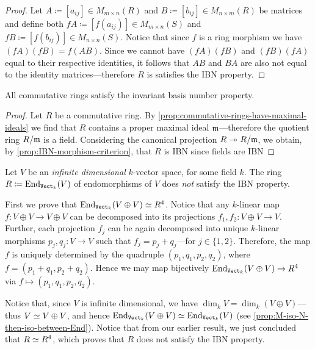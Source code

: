 \begin{proof}
    Let \(A \coloneq [a_{ij}] \in M_{m \times n}(R)\) and
    \(B \coloneq [b_{ij}] \in M_{n \times m}(R)\) be matrices and define both
    \(fA \coloneq [f(a_{ij})] \in M_{m \times n}(S)\) and
    \(fB \coloneq [f(b_{ij})] \in M_{n \times n}(S)\). Notice that since \(f\) is a
    ring morphism we have \((f A)(f B) = f(A B)\). Since we cannot have \((f A) (f
    B)\) and \((f B) (f A)\) equal to their respective identities, it follows that
    \(A B\) and \(B A\) are also not equal to the identity matrices---therefore
    \(R\) is satisfies the IBN property.
\end{proof}

\begin{theorem}
    \label{thm:commutative-rings-satisfy-IBN}
    All commutative rings satisfy the invariant basis number property.
\end{theorem}

\begin{proof}
    Let \(R\) be a commutative ring. By
    \cref{prop:commutative-rings-have-maximal-ideals} we find that \(R\) contains a
    proper maximal ideal \(\mathfrak{m}\)---therefore the quotient ring \(R/\mathfrak{m}\)
    is a field. Considering the canonical projection \(R \twoheadrightarrow R/\mathfrak{m}\), we
    obtain, by \cref{prop:IBN-morphism-criterion}, that \(R\) is IBN since fields
    are IBN
\end{proof}

\begin{example}
    \label{exp:End(V)-isnt-IBN}
    Let \(V\) be an \emph{infinite dimensional} \(k\)-vector space, for some field
    \(k\). The ring \(R \coloneq \operatorname{End}_{{\texttt{Vect}}_k}(V)\) of endomorphisms of \(V\) does
    \emph{not} satisfy the IBN property.

    First we prove that \(\operatorname{End}_{{\texttt{Vect}}_k}(V \oplus V) \simeq R^4\). Notice that any
    \(k\)-linear map \(f: V \oplus V \to V \oplus V\) can be decomposed into its
    projections \(f_1, f_2: V \oplus V \to V\). Further, each projection \(f_j\) can
    be again decomposed into unique \(k\)-linear morphisms \(p_j, q_j: V \to V\)
    such that \(f_j = p_j + q_j\)---for \(j \in \{1, 2\}\). Therefore, the map \(f\)
    is uniquely determined by the quadruple \((p_1, q_1, p_2, q_2)\), where \(f =
    (p_1 + q_1, p_2 + q_2)\). Hence we may map bijectively \(\operatorname{End}_{{\texttt{Vect}}_k}(V \oplus
    V) \to R^4\) via \(f \mapsto (p_1, q_1, p_2, q_2)\).

    Notice that, since \(V\) is infinite dimensional, we have
    \(\dim_k V = \dim_k(V \oplus V)\)---thus \(V \simeq V \oplus V\), and hence
    \(\operatorname{End}_{{\texttt{Vect}}_k}(V \oplus V) \simeq \operatorname{End}_{{\texttt{Vect}}_k}(V)\) (see
    \cref{prop:M-iso-N-then-iso-between-End}). Notice that from our earlier result,
    we just concluded that \(R \simeq R^4\), which proves that \(R\) does not satisfy
    the IBN property.
\end{example}

